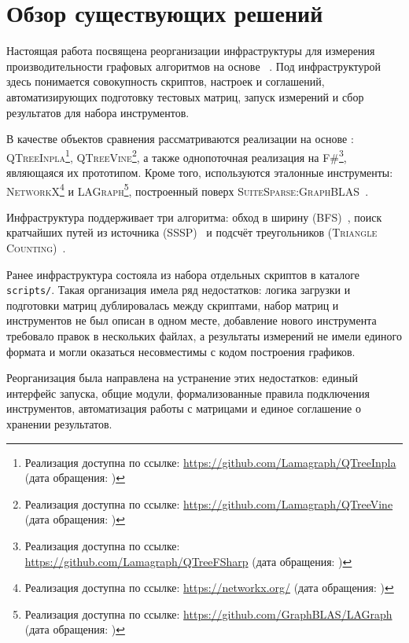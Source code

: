 
\section{Обзор существующих решений}
\label{sec:relatedworks}

Настоящая работа посвящена реорганизации инфраструктуры для измерения производительности графовых алгоритмов на основе \INs{}~\cite{lafontInteractionNets1989}. Под инфраструктурой здесь понимается совокупность скриптов, настроек и соглашений, автоматизирующих подготовку тестовых матриц, запуск измерений и сбор результатов для набора инструментов.

В качестве объектов сравнения рассматриваются реализации на основе \INs{}: \textsc{QTreeInpla}\footnote{Реализация доступна по ссылке: \url{https://github.com/Lamagraph/QTreeInpla} (дата обращения: )}, \textsc{QTreeVine}\footnote{Реализация доступна по ссылке: \url{https://github.com/Lamagraph/QTreeVine} (дата обращения: )}, а также однопоточная реализация на \textsc{F\#}\footnote{Реализация доступна по ссылке: \url{https://github.com/Lamagraph/QTreeFSharp} (дата обращения: )}, являющаяся их прототипом. Кроме того, используются эталонные инструменты: \textsc{NetworkX}\footnote{Реализация доступна по ссылке: \url{https://networkx.org/} (дата обращения: )} и \textsc{LAGraph}\footnote{Реализация доступна по ссылке: \url{https://github.com/GraphBLAS/LAGraph} (дата обращения: )}, построенный поверх \textsc{SuiteSparse:GraphBLAS}~\cite{graphblas}.

Инфраструктура поддерживает три алгоритма: обход в ширину (\textsc{BFS})~\cite{graphblasAlgorithm1000}, поиск кратчайших путей из источника (\textsc{SSSP})~\cite{kepnerGraphAlgorithms2011} и подсчёт треугольников (\textsc{Triangle Counting})~\cite{trianglecounting}.

Ранее инфраструктура состояла из набора отдельных скриптов в каталоге \texttt{scripts/}. Такая организация имела ряд недостатков: логика загрузки и подготовки матриц дублировалась между скриптами, набор матриц и инструментов не был описан в одном месте, добавление нового инструмента требовало правок в нескольких файлах, а результаты измерений не имели единого формата и могли оказаться несовместимы с кодом построения графиков.

Реорганизация была направлена на устранение этих недостатков: единый интерфейс запуска, общие модули, формализованные правила подключения инструментов, автоматизация работы с матрицами и единое соглашение о хранении результатов.
